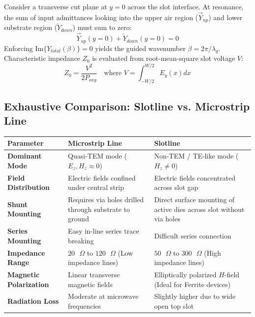 \documentclass[12pt,a4paper]{article}
\renewcommand{\arraystretch}{1.45}
\begin{document}
\begin{tcolorbox}[formulabox, title={Transverse Resonance Condition}]
  Consider a transverse cut plane at $y = 0$ across the slot interface. At resonance, the sum of input admittances looking into the upper air region ($\vec{Y}_{up}$) and lower substrate region ($\overleftarrow{Y}_{down}$) must sum to zero:
  \begin{equation}
    \vec{Y}_{up}(y=0) + \overleftarrow{Y}_{down}(y=0) = 0
  \end{equation}
  Enforcing $\text{Im}\{Y_{total}(\beta)\} = 0$ yields the guided wavenumber $\beta = 2\pi/\lambda_g$. Characteristic impedance $Z_0$ is evaluated from root-mean-square slot voltage $V$:
  \begin{equation}
    Z_0 = \frac{V^2}{2 P_{avg}} \quad \text{where } V = \int_{-W/2}^{W/2} E_y(x) dx
  \end{equation}
\end{tcolorbox}

\subsection{Exhaustive Comparison: Slotline vs. Microstrip Line}

\par\vspace{6pt}\noindent
\begingroup
\renewcommand{\arraystretch}{1.4}%
\begin{tabularx}{\linewidth}{|>{\raggedright\arraybackslash\bfseries}p{3.2cm}|Y|Y|}
\hline
\textbf{Parameter} & \textbf{Microstrip Line} & \textbf{Slotline} \\
\hline
Dominant Mode & Quasi-TEM mode ($E_z, H_z \approx 0$) & Non-TEM / TE-like mode ($H_z \ne 0$) \\
\hline
Field Distribution & Electric fields confined under central strip & Electric fields concentrated across slot gap \\
\hline
Shunt Mounting & Requires via holes drilled through substrate to ground & Direct surface mounting of active dies across slot without via holes \\
\hline
Series Mounting & Easy in-line series trace breaking & Difficult series connection \\
\hline
Impedance Range & $20\text{ }\Omega$ to $120\text{ }\Omega$ (Low impedance lines) & $50\text{ }\Omega$ to $300\text{ }\Omega$ (High impedance lines) \\
\hline
Magnetic Polarization & Linear transverse magnetic fields & Elliptically polarized $H$-field (Ideal for Ferrite devices) \\
\hline
Radiation Loss & Moderate at microwave frequencies & Slightly higher due to wide open top slot \\
\hline
\end{tabularx}
\endgroup
\end{document}
